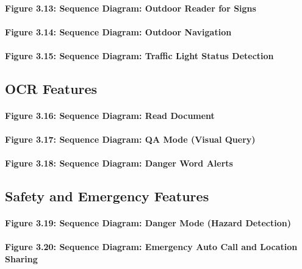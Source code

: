 \documentclass[12pt,a4paper]{report}
\begin{document}
\paragraph*{Figure 3.13: Sequence Diagram: Outdoor Reader for Signs}

\paragraph*{Figure 3.14: Sequence Diagram: Outdoor Navigation}

\paragraph*{Figure 3.15: Sequence Diagram: Traffic Light Status Detection}

\subsection{OCR Features}

\paragraph*{Figure 3.16: Sequence Diagram: Read Document}

\paragraph*{Figure 3.17: Sequence Diagram: QA Mode (Visual Query)}

\paragraph*{Figure 3.18: Sequence Diagram: Danger Word Alerts}

\subsection{Safety and Emergency Features}

\paragraph*{Figure 3.19: Sequence Diagram: Danger Mode (Hazard Detection)}

\paragraph*{Figure 3.20: Sequence Diagram: Emergency Auto Call and Location Sharing}
\end{document}

